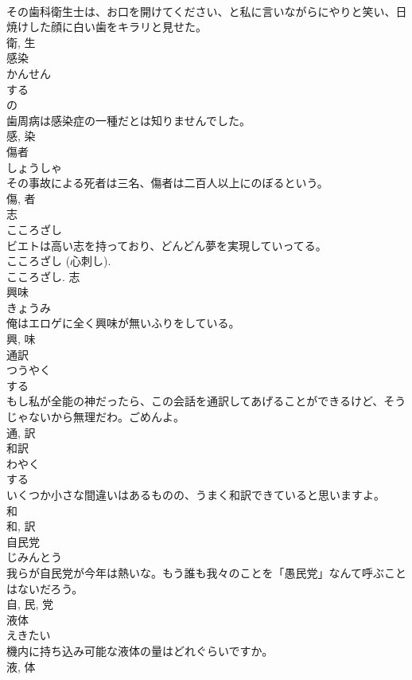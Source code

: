 \documentclass[8pt]{extreport}
\begin{document}
\begin{CJK}{UTF8}{min}
\\	その歯科衛生士は、お口を開けてください、と私に言いながらにやりと笑い、日焼けした顔に白い歯をキラリと見せた。	
\\	衛, 生	
\\	感染	
\\	かんせん	
\\	する 
\\	の 
\\	歯周病は感染症の一種だとは知りませんでした。	
\\	感, 染	
\\	傷者	
\\	しょうしゃ	
\\	その事故による死者は三名、傷者は二百人以上にのぼるという。	
\\	傷, 者	
\\	志	
\\	こころざし	
\\	ビエトは高い志を持っており、どんどん夢を実現していってる。	
\\	こころざし (心刺し). 
\\	こころざし.	志	
\\	興味	
\\	きょうみ	
\\	俺はエロゲに全く興味が無いふりをしている。	
\\	興, 味	
\\	通訳	
\\	つうやく	
\\	する 
\\	もし私が全能の神だったら、この会話を通訳してあげることができるけど、そうじゃないから無理だわ。ごめんよ。	
\\	通, 訳	
\\	和訳	
\\	わやく	
\\	する 
\\	いくつか小さな間違いはあるものの、うまく和訳できていると思いますよ。	
\\	和 
\\	和, 訳	
\\	自民党	
\\	じみんとう	
\\	我らが自民党が今年は熱いな。もう誰も我々のことを「愚民党」なんて呼ぶことはないだろう。	
\\	自, 民, 党	
\\	液体	
\\	えきたい	
\\	機内に持ち込み可能な液体の量はどれぐらいですか。	
\\	液, 体	

\end{CJK}
\end{document}
